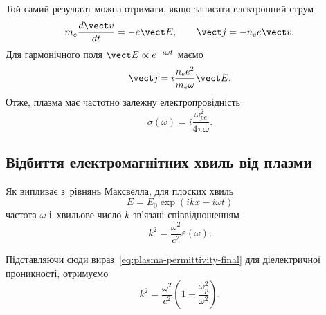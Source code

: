 Той самий результат можна отримати, якщо записати електронний струм
\begin{equation}
	m_e\frac{d\vect v}{dt}=-e\vect E,
	\qquad
	\vect j=-n_e e\vect v.
\end{equation}
Для гармонічного поля $\vect E\propto e^{-i\omega t}$ маємо
\begin{equation}
	\vect j
	=i\frac{n_e e^2}{m_e\omega}\vect E.
\end{equation}
Отже, плазма має частотно залежну електропровідність
\begin{equation}
	\sigma(\omega)
	=i\frac{\omega_{pe}^2}{4\pi\omega}.
\end{equation}

\subsection{Відбиття електромагнітних хвиль від плазми}

Як випливає з~рівнянь Максвелла, для плоских хвиль
\begin{equation}\label{eq:plane-wave}
	E = E_0 \exp(ikx - i\omega t)
\end{equation}
частота $\omega$ і~хвильове число $k$ зв'язані співвідношенням
\begin{equation*}
	k^2 = \frac{\omega^2}{c^2}\varepsilon(\omega).
\end{equation*}

Підставляючи сюди вираз~\eqref{eq:plasma-permittivity-final} для діелектричної проникності, отримуємо
\begin{equation*}
	k^2 = \frac{\omega^2}{c^2}\left(1 - \frac{\omega_p^2}{\omega^2}\right).
\end{equation*}

